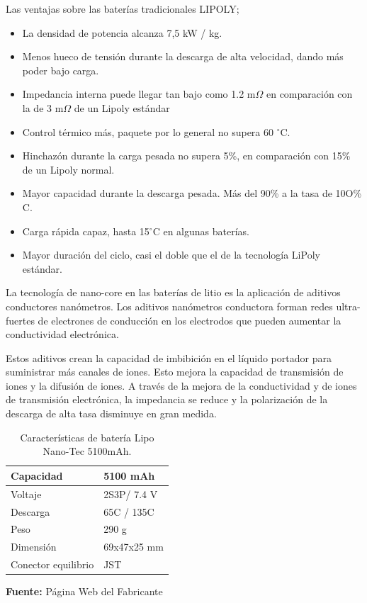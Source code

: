 Las ventajas sobre las bater\'ias tradicionales LIPOLY;
\begin{itemize}
    \item La densidad de potencia alcanza 7,5 kW / kg.
    \item Menos hueco de tensi\'on durante la descarga de alta velocidad, dando m\'as poder bajo carga.
    \item Impedancia interna puede llegar tan bajo como 1.2 m${\Omega }$ en comparación con la de 3 m${\Omega }$ de un Lipoly estándar
    \item Control t\'ermico m\'as, paquete por lo general no supera 60 $^{\circ}$C.
    \item Hinchazón durante la carga pesada no supera 5\%, en comparación con 15\% de un Lipoly normal.
    \item Mayor capacidad durante la descarga pesada. M\'as del 90\% a la tasa de 10O\% C.
    \item Carga r\'apida capaz, hasta 15$^{\circ}$C en algunas baterías.
    \item Mayor duraci\'on del ciclo, casi el doble que el de la tecnolog\'ia LiPoly est\'andar.
\end{itemize}


La tecnolog\'ia de nano-core en las bater\'ias de litio es la aplicaci\'on de aditivos conductores nan\'ometros. Los aditivos nan\'ometros conductora forman redes ultra-fuertes de electrones de conducci\'on en los electrodos que pueden aumentar la conductividad electr\'onica.

Estos aditivos crean la capacidad de imbibici\'on en el l\'iquido portador para suministrar m\'as canales de iones. Esto mejora la capacidad de transmisi\'on de iones y la difusi\'on de iones. A trav\'es de la mejora de la conductividad y de iones de transmisi\'on electr\'onica, la impedancia se reduce y la polarizaci\'on de la descarga de alta tasa disminuye en gran medida.

\hfill
\begin{table}[t]
\protect\caption[Caracter\'isticas de bater\'ia Lipo Nano-Tech ]{Caracter\'isticas de bater\'ia Lipo Nano-Tec 5100mAh.}
\label{tab:caract_bat}
\begin{center}
\begin{tabular}{|l|l|}
\hline
Capacidad    &  5100 mAh \\
\hline
Voltaje      &  2S3P/ 7.4 V \\
\hline
Descarga &  65C / 135C \\
\hline
Peso  & 290 g\\
\hline
Dimensi\'on   &  69x47x25 mm\\
\hline
Conector equilibrio	& JST\\
\hline
\end{tabular}
\vspace{5mm}
\newline
\hfill \textbf{Fuente:} P\'agina Web del Fabricante\cite{bateria}
\end{center}
\end{table}

